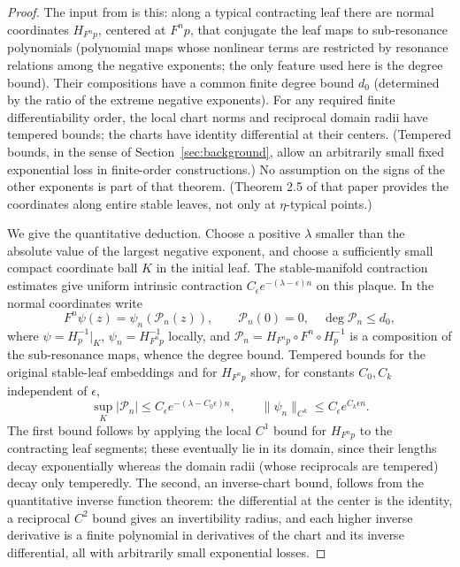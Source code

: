 \documentclass[11pt]{article}
\theoremstyle{remark}
\begin{document}
\begin{proof}
The input from \cite[Theorems 2.3, 2.5 and Section 5.1]{KalininSadovskaya2017}
is this: along a typical contracting leaf there are normal coordinates
\(H_{F^np}\), centered at \(F^np\), that conjugate the leaf maps to
sub-resonance polynomials (polynomial maps whose nonlinear terms are
restricted by resonance relations among the negative exponents; the
only feature used here is the degree bound).  Their compositions have
a common finite degree bound \(d_0\) (determined by the ratio of the
extreme negative exponents).  For any required finite
differentiability order, the
local chart norms and reciprocal domain radii have tempered bounds;
the charts have identity differential at their centers.
(Tempered bounds, in the sense of Section~\ref{sec:background}, allow
an arbitrarily small fixed exponential loss in finite-order
constructions.)  No assumption on the signs of the other exponents is
part of that theorem.  (Theorem 2.5 of that paper provides the
coordinates along entire stable leaves, not only at
\(\eta\)-typical points.)

We give the quantitative deduction.
Choose a positive \(\lambda\) smaller than the absolute value of the
largest negative exponent, and choose a sufficiently small compact
coordinate ball \(K\) in the initial leaf.
The stable-manifold contraction estimates give uniform intrinsic
contraction \(C_\epsilon e^{-(\lambda-\epsilon)n}\) on this plaque.
In the normal coordinates write
\[
 F^n\psi(z)=\psi_n(\mathcal P_n(z)),\qquad \mathcal P_n(0)=0,
 \quad \deg \mathcal P_n\le d_0,
\]
where \(\psi=H_p^{-1}|_K\), \(\psi_n=H_{F^np}^{-1}\) locally, and
\(\mathcal P_n=H_{F^np}\circ F^n\circ H_p^{-1}\) is a composition of
the sub-resonance maps, whence the degree bound.
Tempered bounds for the original stable-leaf embeddings and for
\(H_{F^np}\) show, for constants \(C_0,C_k\) independent of
\(\epsilon\),
\begin{equation}\label{eq:coordinate-bounds}
 \sup_K|\mathcal P_n|\le C_\epsilon e^{-(\lambda-C_0\epsilon)n},
 \qquad
 \|\psi_n\|_{C^k}\le C_\epsilon e^{C_k\epsilon n}.
\end{equation}
The first bound follows by applying
the local \(C^1\) bound for \(H_{F^np}\) to the contracting leaf
segments; these eventually lie in its domain, since their
lengths decay exponentially whereas the domain radii (whose
reciprocals are tempered) decay only temperedly.
The second, an inverse-chart bound, follows from the quantitative
inverse function theorem: the differential at the center is the
identity, a reciprocal \(C^2\) bound gives an invertibility radius,
and each higher inverse derivative is a finite polynomial in
derivatives of the chart and its inverse differential, all with
arbitrarily small exponential losses.


\end{proof}
\end{document}
